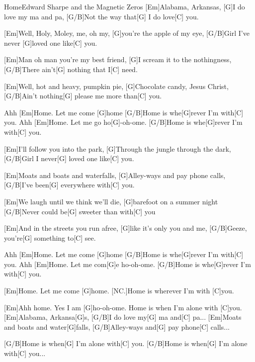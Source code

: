 \documentclass[../main.tex]{subfiles}
\begin{document}
\begin{song}[7]{Home}{Edward Sharpe and the Magnetic Zeros}{}
[Em]Alabama, Arkansas, [G]I do love my ma and pa,
[G/B]Not the way that[G] I do love[C] you. \hh{}

[Em]Well, Holy, Moley, me, oh my, [G]you're the apple of my eye,
[G/B]Girl I've never [G]loved one like[C] you. \hh{}

[Em]Man oh man you're my best friend, [G]I scream it to the nothingness,
[G/B]There ain't[G] nothing that I[C] need. \hh{}

[Em]Well, hot and heavy, pumpkin pie, [G]Chocolate candy, Jesus Christ,
[G/B]Ain't nothing[G] please me more than[C] you.

Ahh [Em]Home. Let me come [G]home
[G/B]Home is whe[G]rever I'm with[C] you.
Ahh [Em]Home. Let me go ho[G]-oh-ome.
[G/B]Home is whe[G]rever I'm with[C] you.

[Em]I'll follow you into the park, [G]Through the jungle through the dark,
[G/B]Girl I never[G] loved one like[C] you. \hh{}

[Em]Moats and boats and waterfalls, [G]Alley-ways and pay phone calls,
[G/B]I've been[G] everywhere with[C] you. \hh{}

[Em]We laugh until we think we’ll die, [G]barefoot on a summer night
[G/B]Never could be[G] sweeter than with[C] you \hh{}

[Em]And in the streets you run afree, [G]like it's only you and me,
[G/B]Geeze, you're[G] something to[C] see.

Ahh [Em]Home. Let me come [G]home
[G/B]Home is whe[G]rever I'm with[C] you.
Ahh [Em]Home. Let me com[G]e ho-oh-ome.
[G/B]Home is whe[G]rever I'm with[C] you.

[Em]Home. Let me come [G]home.
[NC.]Home is wherever I'm with [C]you.

[Em]Ahh home. Yes I am [G]ho-oh-ome. Home is when I'm alone with [C]you.
[Em]Alabama, Arkansa[G]s, [G/B]I do love my[G] ma and[C] pa...
[Em]Moats and boats and water[G]falls, [G/B]Alley-ways and[G] pay phone[C] calls...

[G/B]Home is when[G] I'm alone with[C] you.
[G/B]Home is when[G] I'm alone with[C] you...
\end{song}
\end{document}
